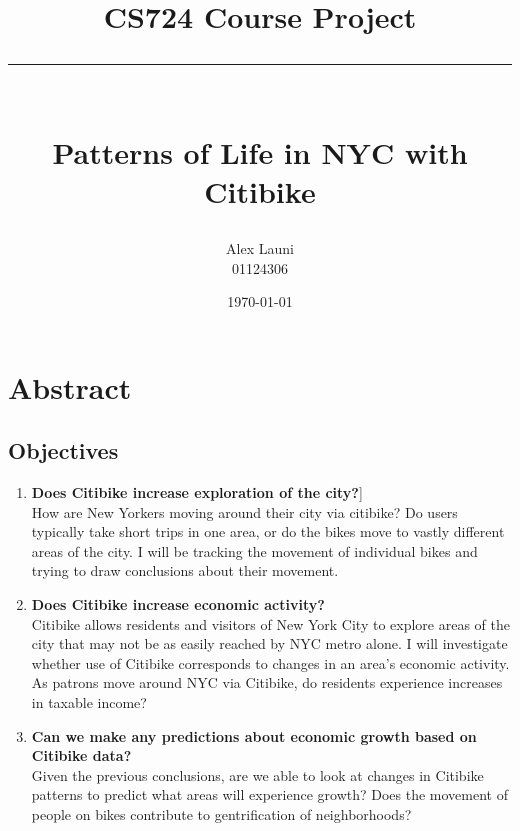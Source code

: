 \documentclass{article}
\title{CS724 Course Project\\\rule{\textwidth}{0.5pt}\\Patterns of Life in NYC with Citibike}
\author{Alex Launi\\01124306}
\date{\today}
\begin{document}
\maketitle

\tableofcontents

\section{Abstract}
\subsection{Objectives}
\begin{enumerate}
\item \textbf{Does Citibike increase exploration of the city?}]\\
How are New Yorkers moving around their city via citibike? Do users typically take short trips in one area, or do the bikes move to vastly different areas of the city. I will be tracking the movement of individual bikes and trying to draw conclusions about their movement.
\item \textbf{Does Citibike increase economic activity?}\\
Citibike allows residents and visitors of New York City to explore areas of the city that may not be as easily reached by NYC metro alone. I will investigate whether use of Citibike corresponds to changes in an area's economic activity. As patrons move around NYC via Citibike, do residents experience increases in taxable income?
\item \textbf{Can we make any predictions about economic growth based on Citibike data?}\\
Given the previous conclusions, are we able to look at changes in Citibike patterns to predict what areas will experience growth? Does the movement of people on bikes contribute to gentrification of neighborhoods?
\end{enumerate}
\end{document}
